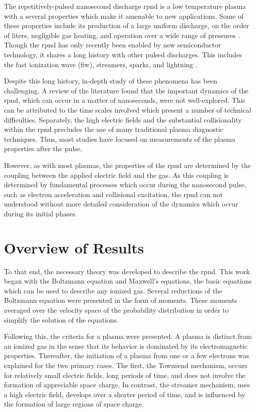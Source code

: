 The repetitively-pulsed nanosecond discharge \acs{rpnd} is a low temperature
plasma with a several properties which make it amenable to new applications.
Some of these properties include its production of a large uniform discharge, on
the order of liters, negligible gas heating, and operation over a wide range of
pressures \cite{Starikovskaia2001}. Though the \acs{rpnd} has only recently been
enabled by new semiconductor technology, it shares a long history with other
pulsed discharges. This includes the fast ionization wave (\acs{fiw}),
streamers, sparks, and lightning \cite{Loeb1965}.

Despite this long history, in-depth study of these phenomena has been
challenging. A review of the literature found that the important dynamics of the
\acs{rpnd}, which can occur in a matter of nanoseconds, were not well-explored.
This can be attributed to the time scales involved which present a number of
technical difficulties. Separately, the high electric fields and the substantial
collisionality within the \acs{rpnd} precludes the use of many traditional
plasma diagnostic techniques. Thus, most studies have focused on measurements of
the plasma properties after the pulse.

However, as with most plasmas, the properties of the \acs{rpnd} are determined
by the coupling between the applied electric field and the gas. As this coupling
is determined by fundamental processes which occur during the nanosecond pulse,
such as electron acceleration and collisional excitation, the \acs{rpnd} can not
understood without more detailed consideration of the dynamics which occur
during its initial phases.

\section{Overview of Results}

To that end, the necessary theory was developed to describe the \acs{rpnd}. This
work began with the Boltzmann equation and Maxwell's equations, the basic
equations which can be used to describe any ionized gas. Several reductions of
the Boltzmann equation were presented in the form of moments. These moments
averaged over the velocity space of the probability distribution in order to
simplify the solution of the equations.

Following this, the criteria for a plasma were presented. A plasma is distinct
from an ionized gas in the sense that its behavior is dominated by its
electromagnetic properties. Thereafter, the initiation of a plasma from one or a
few electrons was explained for the two primary cases. The first, the Townsend
mechanism, occurs for relatively small electric fields, long periods of time,
and does not involve the formation of appreciable space charge. In contrast, the
streamer mechanism, uses a high electric field, develops over a shorter period
of time, and is influenced by the formation of large regions of space charge.

